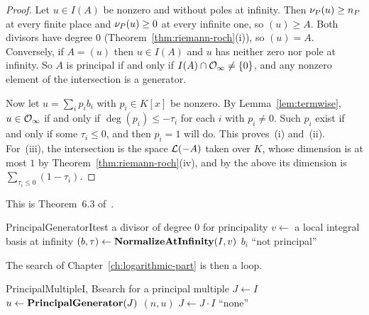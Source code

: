 \begin{proof}
Let $u \in I(A)$ be nonzero and without poles at infinity. Then $\nu_{P}(u)
\ge n_P$ at every finite place and $\nu_{P}(u) \ge 0$ at every infinite one,
so $(u) \ge A$. Both divisors have degree $0$
(Theorem~\ref{thm:riemann-roch}(i)), so $(u) = A$. Conversely, if $A = (u)$
then $u \in I(A)$ and $u$ has neither zero nor pole at infinity. So $A$ is
principal if and only if $I(A) \cap \mathcal{O}_\infty \ne \{0\}$, and any nonzero
element of the intersection is a generator.

Now let $u = \sum_i p_i b_i$ with $p_i \in K[x]$ be nonzero. By
Lemma~\ref{lem:termwise}, $u \in \mathcal{O}_\infty$ if and only if $\deg(p_i) \le
-\tau_i$ for each $i$ with $p_i \ne 0$. Such $p_i$ exist if and only if some
$\tau_i \le 0$, and then $p_i = 1$ will do. This proves~(i) and~(ii). For~(iii),
the intersection is the space $\mathcal{L}(-A)$ taken over $K$, whose dimension is at
most $1$ by Theorem~\ref{thm:riemann-roch}(iv), and by the above its
dimension is $\sum_{\tau_i \le 0} (1 - \tau_i)$.
\end{proof}

This is Theorem~6.3 of~\cite{trager1984}.

\begin{algo}{PrincipalGenerator}{I}{test a divisor of degree $0$ for principality}
\State $v \gets$ a local integral basis at infinity 
\State $(b, \tau) \gets \textbf{NormalizeAtInfinity}(I, v)$
 \Return $b_i$ \EndIf
\State \Return ``not principal''
\end{algo}

The search of Chapter~\ref{ch:logarithmic-part} is then a loop.

\begin{algo}{PrincipalMultiple}{I, B}{search for a principal multiple}
\State $J \gets I$
  \State $u \gets \textbf{PrincipalGenerator}(J)$
   \Return $(n, u)$ \EndIf
  \State $J \gets J \cdot I$
\EndFor
\State \Return ``none''
\end{algo}

